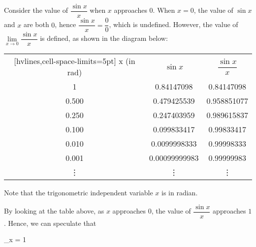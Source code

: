\documentclass[12pt]{report}
\begin{document}
Consider the value of $\dfrac{\sin x}{x}$ when $x$ approaches $0$. When $x =
    0$, the value of $\sin x$ and $x$ are both $0$, hence $\dfrac{\sin x}{x} =
    \dfrac{0}{0}$, which is undefined. However, the value of $\lim\limits_{x \to 0}
    \dfrac{\sin x}{x}$ is defined, as shown in the diagram below:
\begin{center}
    \begin{NiceTabular}{|c|c|c|}[hvlines,cell-space-limits=5pt]
        x (in rad) & $\sin x$      & $\dfrac{\sin x}{x}$ \\
        1          & 0.84147098    & 0.84147098          \\
        0.500      & 0.479425539   & 0.958851077         \\
        0.250      & 0.247403959   & 0.989615837         \\
        0.100      & 0.099833417   & 0.99833417          \\
        0.010      & 0.0099998333  & 0.99998333          \\
        0.001      & 0.00099999983 & 0.99999983          \\
        \vdots     & \vdots        & \vdots              \\
    \end{NiceTabular}
\end{center}
Note that the trigonometric independent variable $x$ is in radian.

By looking at the table above, as $x$ approaches $0$, the value of $\dfrac{\sin
        x}{x}$ approaches $1$. Hence, we can speculate that
\begin{mdframed}[style=MyFrame]
    \begin{cequation}
        \lim\limits_{x }  = 1
    \end{cequation}
\end{mdframed}
\end{document}
